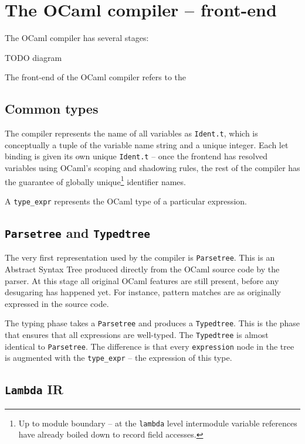 \documentclass[12pt,a4paper,twoside,openright]{report}
\begin{document}

\section{The OCaml compiler -- front-end}

The OCaml compiler has several stages:

TODO diagram

The front-end of the OCaml compiler refers to the 

\subsection{Common types}

The compiler represents the name of all variables as \lstinline!Ident.t!, which
is conceptually a tuple of the variable name string and a unique integer. Each
let binding is given its own unique \lstinline!Ident.t! -- once the frontend
has resolved variables using OCaml's scoping and shadowing rules, the rest of
the compiler has the guarantee of globally unique\footnote{Up to module
boundary -- at the \lstinline!lambda! level intermodule variable references
have already boiled down to record field accesses.} identifier names.

A \lstinline!type_expr! represents the OCaml type of a particular expression.

\subsection{\texttt{Parsetree} and \texttt{Typedtree}}

The very first representation used by the compiler is \lstinline!Parsetree!.
This is an Abstract Syntax Tree produced directly from the OCaml source code by
the parser. At this stage all original OCaml features are still present, before
any desugaring has happened yet. For instance, pattern matches are as
originally expressed in the source code.

The typing phase takes a \lstinline!Parsetree! and produces a
\lstinline!Typedtree!. This is the phase that ensures that all expressions are
well-typed. The \lstinline!Typedtree! is almost identical to
\lstinline!Parsetree!. The difference is that every \lstinline!expression! node
in the tree is augmented with the \lstinline!type_expr! -- the expression of
this type.

\subsection{\texttt{Lambda} IR}
\end{document}
